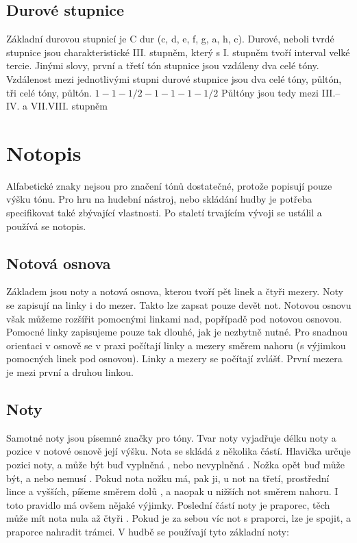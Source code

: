 \subsection{Durové stupnice}
Základní durovou stupnicí je C dur (c, d, e, f, g, a, h, c).
Durové, neboli tvrdé stupnice jsou charakteristické III. stupněm,
který s I. stupněm tvoří interval velké tercie.
Jinými slovy, první a třetí tón stupnice jsou vzdáleny dva celé tóny.
Vzdálenost mezi jednotlivými stupni durové stupnice jsou dva celé tóny, půltón, tři celé tóny, půltón.
$ 1 - 1 - 1/2 - 1 - 1 - 1 - 1/2 $
Půltóny jsou tedy mezi III.--IV. a VII.VIII. stupněm


\section{Notopis}
Alfabetické znaky nejsou pro značení tónů dostatečné, protože popisují pouze výšku tónu.
Pro hru na hudební nástroj, nebo skládání hudby je potřeba specifikovat také zbývající vlastnosti.
Po staletí trvajícím vývoji se ustálil a používá se notopis.\par

\subsection*{Notová osnova}
Základem jsou noty a notová osnova, kterou tvoří pět linek a čtyři mezery.
Noty se zapisují na linky i do mezer.
Takto lze zapsat pouze devět not.
Notovou osnovu však můžeme rozšířit pomocnými linkami nad, popřípadě pod notovou osnovou. 
Pomocné linky zapisujeme pouze tak dlouhé, jak je nezbytně nutné.
Pro snadnou orientaci v osnově se v praxi počítají linky a mezery směrem nahoru (s výjimkou pomocných linek pod osnovou). 
Linky a mezery se počítají zvlášť. 
První mezera je mezi první a druhou linkou.\par


\subsection*{Noty}
Samotné noty jsou písemné značky pro tóny.
Tvar noty vyjadřuje délku noty a pozice v notové osnově její výšku.
Nota se skládá z několika částí.
Hlavička určuje pozici noty, a může být buď vyplněná , nebo nevyplněná . 
Nožka opět buď může být, a nebo nemusí . 
Pokud nota nožku má, pak ji, u not na třetí, prostřední lince a vyšších, píšeme směrem dolů ,
a naopak u nižších not směrem nahoru.
I toto pravidlo má ovšem nějaké výjimky.
Poslední částí noty je praporec, těch může mít nota nula až čtyři .
Pokud je za sebou víc not s praporci, lze je spojit, a praporce nahradit trámci.
V hudbě se používají tyto základní noty:

